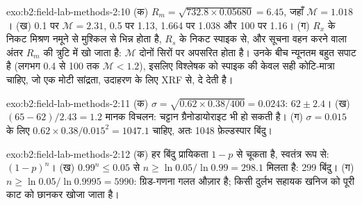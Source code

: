 \begin{solution}{exo:b2:field-lab-methods-2:10}
(क) $R_m = \sqrt{732.8 \times 0.05680} = 6.45$, जहाँ $\mathcal M = 1.018$। (ख) 0.1 पर $\mathcal M = 2.31$,
0.5 पर 1.13, 1.664 पर 1.038 और 100 पर 1.16। (ग) $R_x$ के निकट मिश्रण नमूने से मुश्किल से भिन्न होता है,
$R_s$ के निकट स्पाइक से, और सूचना वहन करने वाला अंतर $R_m$ की त्रुटि में खो जाता है:
$\mathcal M$ दोनों सिरों पर अपसरित होता है। उनके बीच न्यूनतम बहुत सपाट है
(लगभग 0.4 से 100 तक $\mathcal M < 1.2$), इसलिए विश्लेषक को स्पाइक की केवल सही कोटि-मात्रा चाहिए,
जो एक मोटी सांद्रता, उदाहरण के लिए XRF से, दे देती है।
\end{solution}

\begin{solution}{exo:b2:field-lab-methods-2:11}
(क) $\sigma = \sqrt{0.62 \times 0.38/400} = 0.0243$: $62 \pm 2.4$। (ख) $(65 - 62)/2.43 = 1.2$
मानक विचलन: चट्टान ग्रैनोडायोराइट भी हो सकती है। (ग) $\sigma = 0.015$ के लिए $0.62 \times
0.38/0.015^2 = 1047.1$ चाहिए, अतः 1048 फ़ेल्डस्पार बिंदु।
\end{solution}

\begin{solution}{exo:b2:field-lab-methods-2:12}
(क) हर बिंदु प्रायिकता $1 - p$ से चूकता है, स्वतंत्र रूप से: $(1-p)^n$। (ख) $0.99^n \le 0.05$
से $n \ge \ln 0.05/\ln 0.99 = 298.1$ मिलता है: 299 बिंदु। (ग) $n \ge \ln 0.05/\ln 0.9995 = 5990$: ग्रिड-गणना
गलत औज़ार है; किसी दुर्लभ सहायक खनिज को पूरी काट को छानकर खोजा जाता है।
\end{solution}

